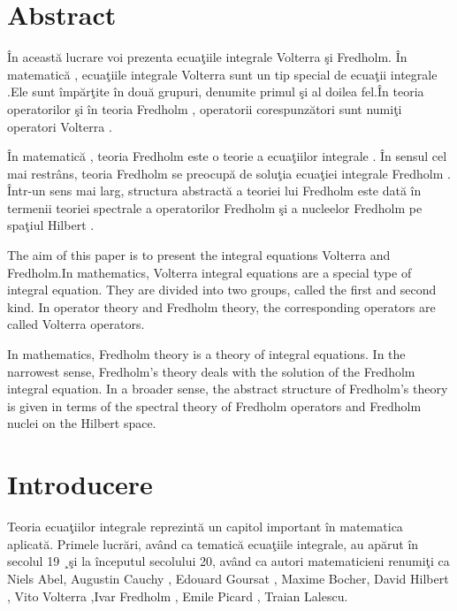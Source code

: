 \documentclass[a4paper,12pt,oneside]{report}
\begin{document}
\maketitle

\tableofcontents

\newpage
{}

\chapter*{Abstract}

\^{I}n aceast\u{a} lucrare voi prezenta ecua\c{t}iile integrale Volterra \c{s}i Fredholm. \^{I}n matematic\u{a} , ecua\c{t}iile integrale Volterra sunt un tip special de ecua\c{t}ii integrale .Ele sunt \^{i}mp\u{a}r\c{t}ite \^{i}n dou\u{a} grupuri, denumite primul \c{s}i al doilea fel.\^{I}n teoria operatorilor \c{s}i \^{i}n teoria Fredholm , operatorii corespunz\u{a}tori sunt numi\c{t}i operatori Volterra . 

\^{I}n matematic\u{a} , teoria Fredholm este o teorie a ecua\c{t}iilor integrale . \^{I}n sensul cel mai restr\^{a}ns, teoria Fredholm se preocup\u{a} de solu\c{t}ia ecua\c{t}iei integrale Fredholm . \^{I}ntr-un sens mai larg, structura abstract\u{a} a teoriei lui Fredholm este dat\u{a} \^{i}n termenii teoriei spectrale a operatorilor Fredholm \c{s}i a nucleelor Fredholm pe spa\c{t}iul Hilbert .

The aim of this paper is to present the integral equations Volterra and Fredholm.In mathematics, Volterra integral equations are a special type of integral equation. They are divided into two groups, called the first and second kind. In operator theory and Fredholm theory, the corresponding operators are called Volterra operators. 

In mathematics, Fredholm theory is a theory of integral equations. In the narrowest sense, Fredholm's theory deals with the solution of the Fredholm integral equation. In a broader sense, the abstract structure of Fredholm's theory is given in terms of the spectral theory of Fredholm operators and Fredholm nuclei on the Hilbert space.

\chapter*{Introducere}

Teoria ecua\c{t}iilor integrale reprezint\u{a} un capitol important \^{i}n matematica aplicat\u{a}. Primele lucr\u{a}ri, av\^{a}nd ca tematic\u{a} ecua\c{t}iile integrale, au ap\u{a}rut \^{i}n secolul 19 ¸\c{s}i la \^{i}nceputul secolului 20, av\^{a}nd ca autori matematicieni renumi\c{t}i ca Niels Abel, Augustin Cauchy , Edouard Goursat , Maxime Bocher, David Hilbert , Vito Volterra ,Ivar Fredholm , Emile Picard , Traian Lalescu.
\end{document}
